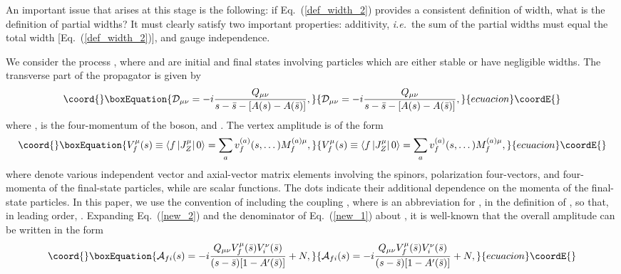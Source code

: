 \documentclass[a4paper,12pt]{article}
\begin{document}
An important issue that arises at this stage is the following:
if Eq.~(\ref{def_width_2}) provides a consistent definition of width, what is
the definition of partial widths?
It must clearly satisfy two important properties: additivity, {\it i.e.}\ the
sum of the partial widths must equal the total width
[Eq.~(\ref{def_width_2})], and gauge independence.

We consider the process \coordHE{}, where \coordHE{} and \coordHE{} are
initial and final states involving particles which are either stable or have 
negligible widths.
The transverse part of the propagator is given by 
\begin{equation}\coord{}\boxEquation{
\label{new_1}
{\cal D}_{\mu\nu}=-i\frac{Q_{\mu\nu}}{s-\bar s-[A(s)-A(\bar s)]}, 
}{
{\cal D}_{\mu\nu}=-i\frac{Q_{\mu\nu}}{s-\bar s-[A(s)-A(\bar s)]}, 
}{ecuacion}\coordE{}\end{equation}
where \coordHE{}, \coordHE{} is the four-momentum of
the \coordHE{} boson, and \coordHE{}.
The vertex amplitude is of the form 
\begin{equation}\coord{}\boxEquation{
\label{new_2}
V_f^\mu(s)\equiv\left\langle f\left|J^\mu_Z\right|0\right\rangle
=\sum_av^{(a)}_f(s,\dots)M^{(a)\mu}_f,
}{
V_f^\mu(s)\equiv\left\langle f\left|J^\mu_Z\right|0\right\rangle
=\sum_av^{(a)}_f(s,\dots)M^{(a)\mu}_f,
}{ecuacion}\coordE{}\end{equation}
where \coordHE{} denote various independent vector and axial-vector matrix
elements involving the spinors, polarization four-vectors, and four-momenta of
the final-state particles, while \coordHE{} are scalar functions.
The dots indicate their additional dependence on the momenta of the 
final-state particles. 
In this paper, we use the convention of including the coupling \coordHE{}, where
\coordHE{} is an abbreviation for \coordHE{}, in the definition of
\coordHE{}, so that, in leading order, \coordHE{}.
Expanding Eq.~(\ref{new_2}) and the denominator of Eq.~(\ref{new_1}) about
\coordHE{}, it is well-known \cite{zmass} that the overall amplitude can be written in the
form 
\begin{equation}\coord{}\boxEquation{\label{new_3}
{\cal A}_{fi}(s)=-i\frac{Q_{\mu\nu}V_f^\mu(\bar s)V_i^\nu(\bar s)}
{(s-\bar s)[1-A^\prime(\bar s)]}+N,
}{{\cal A}_{fi}(s)=-i\frac{Q_{\mu\nu}V_f^\mu(\bar s)V_i^\nu(\bar s)}
{(s-\bar s)[1-A^\prime(\bar s)]}+N,
}{ecuacion}\coordE{}\end{equation}
\end{document}
